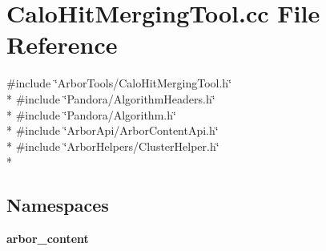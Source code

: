 \section{Calo\+Hit\+Merging\+Tool.\+cc File Reference}
\label{CaloHitMergingTool_8cc}
{\ttfamily \#include \char`\"{}Arbor\+Tools/\+Calo\+Hit\+Merging\+Tool.\+h\char`\"{}}\\*
{\ttfamily \#include \char`\"{}Pandora/\+Algorithm\+Headers.\+h\char`\"{}}\\*
{\ttfamily \#include \char`\"{}Pandora/\+Algorithm.\+h\char`\"{}}\\*
{\ttfamily \#include \char`\"{}Arbor\+Api/\+Arbor\+Content\+Api.\+h\char`\"{}}\\*
{\ttfamily \#include \char`\"{}Arbor\+Helpers/\+Cluster\+Helper.\+h\char`\"{}}\\*
\subsection*{Namespaces}
\begin{DoxyCompactItemize}
\item 
 {\bf arbor\+\_\+content}
\end{DoxyCompactItemize}

